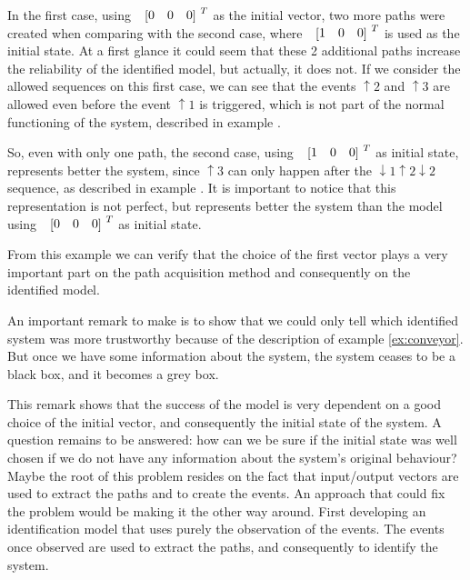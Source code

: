  In the first case, using $\colvec{0&0&0}^T$ as the initial vector, two more
  paths were created when comparing with the second case, where
  $\colvec{1&0&0}^T$ is used as the initial state. At a first glance it could
  seem that these 2 additional paths increase the reliability of the identified model,
  but actually, it does not. If we consider the allowed
  sequences on this first case, we can see that the events $\uparrow 2$ and
  $\uparrow 3$ are allowed even before the event $\uparrow 1$ is triggered,
  which is not part of the normal functioning of the system, described in
  example .

  So, even with only one path, the second case, using $\colvec{1&0&0}^T$ as
  initial state, represents better the system, since $\uparrow 3$ can only happen
  after the $\downarrow 1\uparrow 2\downarrow 2$ sequence, as described in
  example . It is important to notice that this
  representation is not perfect, but represents better the system than the model
  using $\colvec{0&0&0}^T$ as initial state.

  From this example we can verify that the choice of the first vector plays a very important part on
  the
  path acquisition method and consequently on the identified
  model.
  \begin{observation}
  An important remark to make is to show that we could only tell
  which identified system was more trustworthy because of the description of
  example \ref{ex:conveyor}. But once we have some information about the system,
  the system ceases to be a black box, and it becomes a grey box. 
\end{observation}

This remark shows that the success of the \DAOCT{} model is very dependent on a good
choice of the initial vector, and consequently the initial state of the
system. A question remains to be answered: how can we be sure if the
initial state was well chosen if we do not have any information about the system's original behaviour?
Maybe the root of this problem resides on the fact that input\slash output vectors
are used to extract the paths and to create the events. An approach that could
fix the problem would be
making it the other way around. First developing an identification model that uses purely
the observation of the events. The events once observed are used to
extract the paths, and consequently to identify the system.

